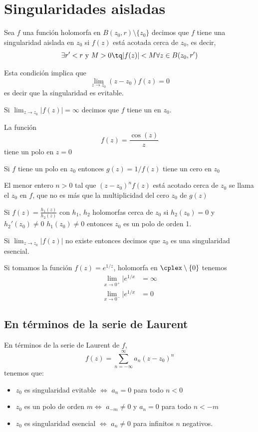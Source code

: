 \documentclass{apuntes}
\begin{document}
\section{Singularidades aisladas}

\begin{defn}
Sea $f$ una función holomorfa en $B(z_0,r)\setminus\{z_0\}$ decimos que $f$ tiene una singularidad aislada en $z_0$ si $f(z)$ está acotada cerca de $z_0$, es decir,
\[\exists r'<r \text{ y } M>0 \tq |f(z)| < M \forall z \in B(z_0, r')\]

Esta condición implica que
\[\lim_{z \to z_0}(z-z_0)f(z)=0\]
es decir que la singularidad es evitable.
\end{defn}

Si $\lim_{z \to z_0}|f(z)|=\infty$ decimos que $f$ tiene un  en $z_0$.

\begin{example}
La función
\[f(z)=\frac{\cos(z)}{z}\]
tiene un polo en $z=0$
\end{example}

\obs Si $f$ tiene un polo en $z_0$ entonces $g(z)=1/f(z)$ tiene un cero en $z_0$

El menor entero $n>0$ tal que $(z-z_0)^nf(z)$ está acotado cerca de $z_0$ se llama el  $z_0$ en $f$, que no es más que la multiplicidad del cero $z_0$ de $g(z)$

\obs Si $f(z)=\frac{h_1(z)}{h_2(z)}$ con $h_1$, $h_2$ holomorfas cerca de $z_0$ si $h_2(z_0)=0$ y $h_2'(z_0)\neq 0$ $h_1(z_0)\neq 0$ entonces $z_0$ es un polo de orden 1.

\begin{defn}
Si $\lim_{z \to z_0} |f(z)|$ no existe entonces decimos que $z_0$ es una singularidad esencial.
\end{defn}

\begin{example}
Si tomamos la función $f(z)=e^{1/z}$, holomorfa en $\cplex \setminus \{0\}$ tenemos
\begin{align}
\lim_{x \to 0^+}|e^{1/x}&=\infty\\
\lim_{x \to 0^-}|e^{1/x}&=0
\end{align}
\end{example}

\subsection{En términos de la serie de Laurent}
En términos de la serie de Laurent de $f$,
\[f(z)=\sum_{n=-\infty}^{\infty}a_n(z-z_0)^n\]
tenemos que:
\begin{itemize}
\item $z_0$ es singularidad evitable $\iff$ $a_n=0$ para todo $n < 0$
\item $z_0$ es un polo de orden $m \iff$ $a_{-m} \neq 0$ y $a_n=0$ para todo $n < -m$
\item $z_0$ es singularidad esencial $\iff$ $a_n \neq 0$ para infinitos $n$ negativos.
\end{itemize}
\end{document}
